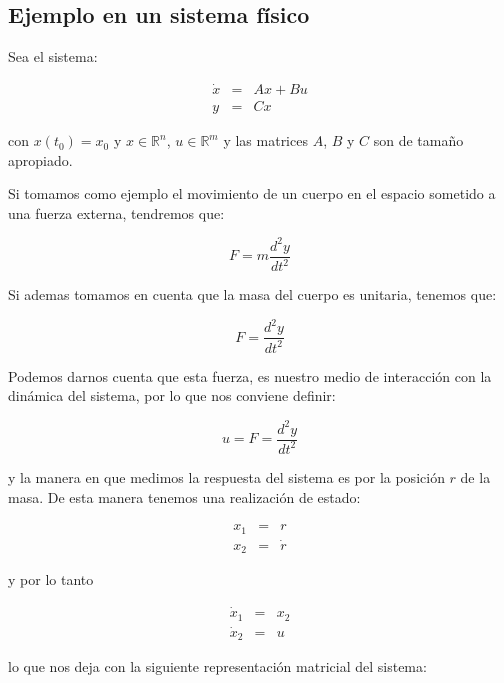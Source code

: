 	\subsection{Ejemplo en un sistema físico}

		Sea el sistema:

		\begin{eqnarray*}
			\dot{x} & = & A x + B u \\
			y & = & C x
		\end{eqnarray*}

		con $x(t_0) = x_0$ y $x \in \mathbb{R}^n$, $u \in \mathbb{R}^m$ y las matrices $A$, $B$ y $C$ son de tamaño apropiado.

		Si tomamos como ejemplo el movimiento de un cuerpo en el espacio sometido a una fuerza externa, tendremos que:

		\begin{equation*}
			F = m \frac{d^2 y}{dt^2}
		\end{equation*}

		Si ademas tomamos en cuenta que la masa del cuerpo es unitaria, tenemos que:

		\begin{equation*}
			F = \frac{d^2 y}{dt^2}
		\end{equation*}

		Podemos darnos cuenta que esta fuerza, es nuestro medio de interacción con la dinámica del sistema, por lo que nos conviene definir:

		\begin{equation*}
			u = F = \frac{d^2 y}{dt^2}
		\end{equation*}

		y la manera en que medimos la respuesta del sistema es por la posición $r$ de la masa.
		De esta manera tenemos una realización de estado:

		\begin{eqnarray*}
			x_1 & = & r \\
			x_2 & = & \dot{r}
		\end{eqnarray*}

		y por lo tanto

		\begin{eqnarray*}
			\dot{x}_1 & = & x_2 \\
			\dot{x}_2 & = & u
		\end{eqnarray*}

		lo que nos deja con la siguiente representación matricial del sistema:

